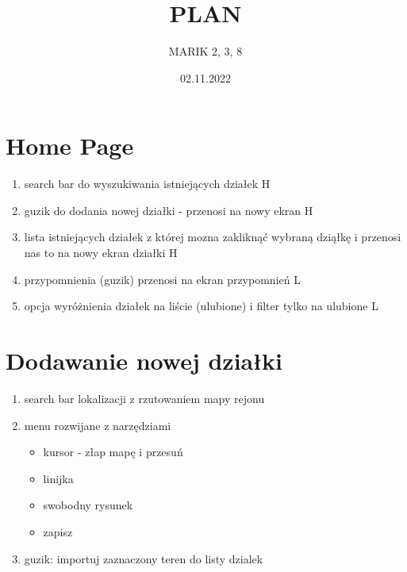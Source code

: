 \documentclass[12pt]{article}
\author{MARIK 2, 3, 8}
\title{PLAN}
\date{02.11.2022}
\begin{document}
\maketitle

\tableofcontents

\section{Home Page}
\begin{enumerate}
    \item search bar do wyszukiwania istniejących działek H
    \item guzik do dodania nowej działki - przenosi na nowy ekran H
    \item lista istniejących działek z której mozna zakliknąć wybraną 
    dziąłkę
    i przenosi nas to na nowy ekran działki H
    \item przypomnienia (guzik) przenosi na ekran przypomnień L
    \item opcja wyróżnienia działek na liście (ulubione) i filter tylko na ulubione L

\end{enumerate}
\newpage
\section{Dodawanie nowej działki}
\begin{enumerate}
    \item search bar lokalizacji z rzutowaniem mapy rejonu
    \item menu rozwijane z narzędziami
    \begin{itemize}
        \item kursor - złap mapę i przesuń
        \item linijka
        \item swobodny rysunek
        \item zapisz
    \end{itemize}
    \item guzik: importuj zaznaczony teren do listy dzialek
\end{enumerate}
\end{document}
